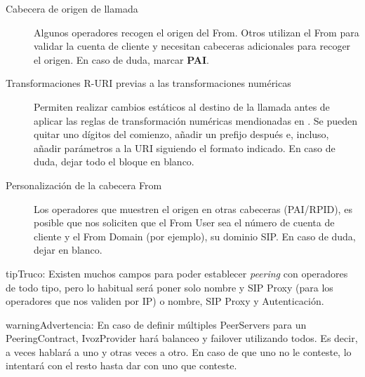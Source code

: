 \documentclass[letterpaper,10pt,spanish]{sphinxmanual}
\begin{document}
\begin{description}
\item[{Cabecera de origen de llamada}] \leavevmode{}\label{external_incoming_calls/peering_contracts:term-cabecera-de-origen-de-llamada}
Algunos operadores recogen el origen del From. Otros utilizan el From para validar la cuenta de cliente y necesitan cabeceras adicionales para recoger el origen. En caso de duda, marcar \textbf{PAI}.

\item[{Transformaciones R-URI previas a las transformaciones numéricas}] \leavevmode{}\label{external_incoming_calls/peering_contracts:term-transformaciones-r-uri-previas-a-las-transformaciones-numericas}
Permiten realizar cambios estáticos al destino de la llamada antes de aplicar las reglas de transformación numéricas mendionadas en {\hyperref[external_incoming_calls/numeric_transformations:numeric\string-transformations]{}}. Se pueden quitar uno dígitos del comienzo, añadir un prefijo después e, incluso, añadir parámetros a la URI siguiendo el formato indicado. En caso de duda, dejar todo el bloque en blanco.

\item[{Personalización de la cabecera From}] \leavevmode{}\label{external_incoming_calls/peering_contracts:term-personalizacion-de-la-cabecera-from}
Los operadores que muestren el origen en otras cabeceras (PAI/RPID), es posible que nos soliciten que el From User sea el número de cuenta de cliente y el From Domain (por ejemplo), su dominio SIP. En caso de duda, dejar en blanco.

\end{description}

\begin{notice}{tip}{Truco:}
Existen muchos campos para poder establecer \emph{peering} con operadores de todo tipo, pero lo habitual será poner solo nombre y SIP Proxy (para los operadores que nos validen por IP) o nombre, SIP Proxy y Autenticación.
\end{notice}

\begin{notice}{warning}{Advertencia:}
En caso de definir múltiples PeerServers para un PeeringContract, IvozProvider hará balanceo y failover utilizando todos. Es decir, a veces hablará a uno y otras veces a otro. En caso de que uno no le conteste, lo intentará con el resto hasta dar con uno que conteste.
\end{notice}
\end{document}
